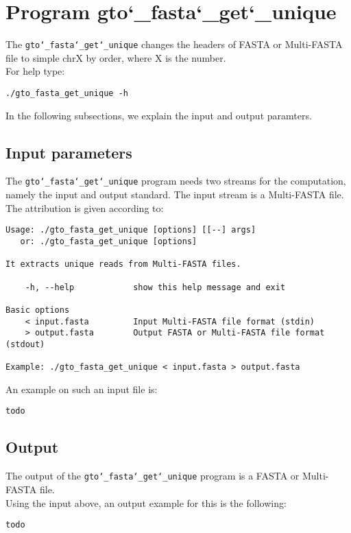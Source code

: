 \section{Program gto\char`_fasta\char`_get\char`_unique}
The \texttt{gto\char`_fasta\char`_get\char`_unique} changes the headers of FASTA or Multi-FASTA file to simple chrX by order, where X is the number.\\
For help type:
\begin{lstlisting}
./gto_fasta_get_unique -h
\end{lstlisting}
In the following subsections, we explain the input and output paramters.

\subsection*{Input parameters}

The \texttt{gto\char`_fasta\char`_get\char`_unique} program needs two streams for the computation, namely the input and output standard. The input stream is a Multi-FASTA file.\\
The attribution is given according to:
\begin{lstlisting}
Usage: ./gto_fasta_get_unique [options] [[--] args]
   or: ./gto_fasta_get_unique [options]

It extracts unique reads from Multi-FASTA files.

    -h, --help            show this help message and exit

Basic options
    < input.fasta         Input Multi-FASTA file format (stdin)
    > output.fasta        Output FASTA or Multi-FASTA file format (stdout)

Example: ./gto_fasta_get_unique < input.fasta > output.fasta
\end{lstlisting}
An example on such an input file is:
\begin{lstlisting}
todo
\end{lstlisting}

\subsection*{Output}
The output of the \texttt{gto\char`_fasta\char`_get\char`_unique} program is a FASTA or Multi-FASTA file.\\
Using the input above, an output example for this is the following:
\begin{lstlisting}
todo
\end{lstlisting}
